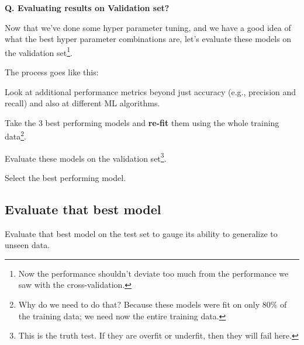 \begin{frame}{\textbf{Q. Evaluating results on Validation set?}}
  \begin{wideitemize}\small
    \item Now that we've done some hyper parameter tuning, and we have a good idea
    of what the best hyper parameter combinations are, let's evaluate these models on
    the validation set\footnote{Now the performance shouldn't deviate too much from
    the performance we saw with the cross-validation.}.
    \item The process goes like this:
    \begin{wideitemize}
      \item[1] Look at additional performance metrics beyond just accuracy
      (e.g., precision and recall) and also at different ML algorithms.
      \item[2] Take the $3$ best performing models and \textbf{re-fit} them
      using the whole training data\footnote{Why do we need to do that? Because
      these models were fit on only $80$\% of the training data; we need now the entire training data.}.
      \item[3] Evaluate these models on the validation set\footnote{This is the truth test.
      If they are overfit or underfit, then they will fail here.}.
      \item[4] Select the best performing model.
    \end{wideitemize}
  \end{wideitemize}
\end{frame}

\subsection{Evaluate that best model}
\begin{transitionsubframe}
  \begin{center}
    \Huge Evaluate that best model on the test set to gauge its ability
    to generalize to unseen data.
  \end{center}
\end{transitionsubframe}

